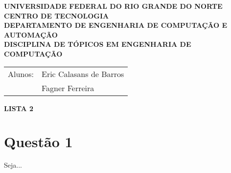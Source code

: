\documentclass[a4paper, 12pt, fleqn]{article}
\begin{document}
	\begin{center}
		\textbf{UNIVERSIDADE FEDERAL DO RIO GRANDE DO NORTE\\		
		CENTRO DE TECNOLOGIA\\		
		DEPARTAMENTO DE ENGENHARIA DE COMPUTAÇÃO E AUTOMAÇÃO\\		
		DISCIPLINA DE TÓPICOS EM ENGENHARIA DE COMPUTAÇÃO}
	\end{center}

	\begin{tabular}{rl}
		Alunos:  &Eric Calasans de Barros\\
		&Fagner Ferreira
	\end{tabular}
		

	\begin{center}
		\large{\textbf{LISTA 2}}
	\end{center}
	

	\section{Questão 1}
		Seja...
\end{document}
